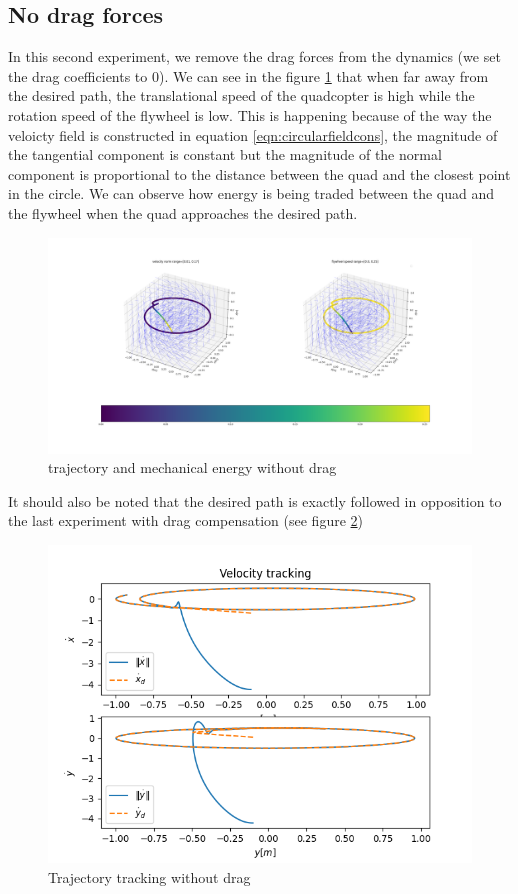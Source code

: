 \subsection{No drag forces}
In this second experiment, we remove the drag forces from the dynamics (we set the drag coefficients to 0).
We can see in the figure \ref{fig:pythonnodrag} that when far away from the desired path, the translational speed of the quadcopter is high while the rotation speed of the flywheel is low.
This is happening because of the way the veloicty field is constructed in equation \ref{eqn:circularfieldcons}, 
the magnitude of the tangential component is constant but the magnitude of the normal component is proportional to the distance between the quad and the closest point in the circle.
We can observe how energy is being traded between the quad and the flywheel when the quad approaches the desired path.
\begin{figure}[h!]
   \centering
   \includegraphics[width=\linewidth]{Images/python-nodrag.png}
   \caption{trajectory and mechanical energy without drag }
   \label{fig:pythonnodrag}
\end{figure}
It should also be noted that the desired path is exactly followed in opposition to the last experiment with drag compensation (see figure \ref{fig:trajtracknodrag})
\begin{figure}[h!]
   \centering
   \includegraphics[width=\linewidth]{Images/velocitytrackingpythonnodrag.png}
   \caption{Trajectory tracking without drag}
   \label{fig:trajtracknodrag}
\end{figure}
